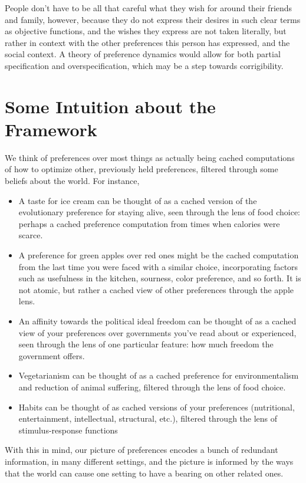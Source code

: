 \documentclass{article}
\begin{document}
	People don't have to be all that careful what they wish for around their friends and family, however, because they do not express their desires in such clear terms as objective functions, and the wishes they express are not taken literally, but rather in context with the other preferences this person has expressed, and the social context. A theory of preference dynamics would allow for both partial specification and overspecification, which may be a step towards corrigibility.
	
	\section{Some Intuition about the Framework}
	We think of preferences over most things as actually being cached computations of how to optimize other, previously held preferences, filtered through some beliefs about the world. For instance, 
	
	\begin{itemize}[nosep]
		\item A taste for ice cream can be thought of as a cached version of the evolutionary preference for staying alive, seen through the lens of food choice: perhaps a cached preference computation from times when calories were scarce.
		\item A preference for green apples over red ones might be the cached computation from the last time you were faced with a similar choice, incorporating factors such as usefulness in the kitchen, sourness, color preference, and so forth. It is not atomic, but rather a cached view of other preferences through the apple lens.
		\item An affinity towards the political ideal freedom can be thought of as a cached view of your preferences over governments you've read about or experienced, seen through the lens of one particular feature: how much freedom the government offers.
		\item Vegetarianism can be thought of as a cached preference for environmentalism and reduction of animal suffering, filtered through the lens of food choice.
		\item Habits can be thought of as cached versions of your preferences (nutritional, entertainment, intellectual, structural, etc.), filtered through the lens of stimulus-response functions
	\end{itemize}
	
	With this in mind, our picture of preferences encodes a bunch of redundant information, in many different settings, and the picture is informed by the ways that the world can cause one setting to have a bearing on other related ones. 
	
\end{document}

